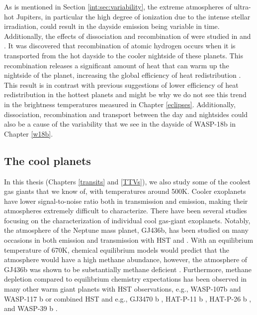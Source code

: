 As is mentioned in Section \ref{int:sec:variability}, the extreme atmospheres of ultra-hot Jupiters, in particular the high degree of ionization due to the intense stellar irradiation, could result in the dayside emission being variable in time. Additionally, the effects of dissociation and recombination of  were studied in \citet{Komacek2018b} and \citet{Bell2018}. It was discovered that recombination of atomic hydrogen occurs when it is transported from the hot dayside to the cooler nightside of these planets. This recombination releases a significant amount of heat that can warm up the nightside of the planet, increasing the global efficiency of heat redistribution \citep{Mansfield2020}. This result is in contrast with previous suggestions of lower efficiency of heat redistribution in the hottest planets and might be why we do not see this trend in the brightness temperatures measured in Chapter \ref{eclipses}. Additionally, dissociation, recombination and transport between the day and nightsides could also be a cause of the variability that we see in the dayside of WASP-18b in Chapter \ref{w18b}.

\subsection{The cool planets}

In this thesis (Chapters \ref{transits} and \ref{TTVs}), we also study some of the coolest gas giants that we know of, with temperatures around 500K. Cooler exoplanets have lower signal-to-noise ratio both in transmission and emission, making their atmospheres extremely difficult to characterize. There have been several studies focusing on the characterization of individual cool gas-giant exoplanets. Notably, the atmosphere of the Neptune mass planet, GJ436b, has been studied on many occasions in both emission and transmission with HST and \spitzerIRAC \citep{Deming2007, Demory2007, Gillon2007a, Gillon2007b, Stevenson2010a, Beaulieu2011, Knutson2011, Lanotte2014, Knutson2014a, Morley2017}. With an equilibrium temperature of 670K, chemical equilibrium models would predict that the atmosphere would have a high methane abundance, however, the atmosphere of GJ436b was shown to be substantially methane deficient \citep{Stevenson2010a, Knutson2011, Lanotte2014}. Furthermore, methane depletion compared to equilibrium chemistry expectations has been observed in many other warm giant planets with HST observations, e.g., WASP-107b and WASP-117 b \citep{Kreidberg2018a, Spake2018} or combined HST and \spitzer e.g., GJ3470 b \citep{Benneke2019}, HAT-P-11 b \citep{Chachan2019}, HAT-P-26 b \citep{Wakeford2017}, and WASP-39 b \citep{Wakeford2018}.

